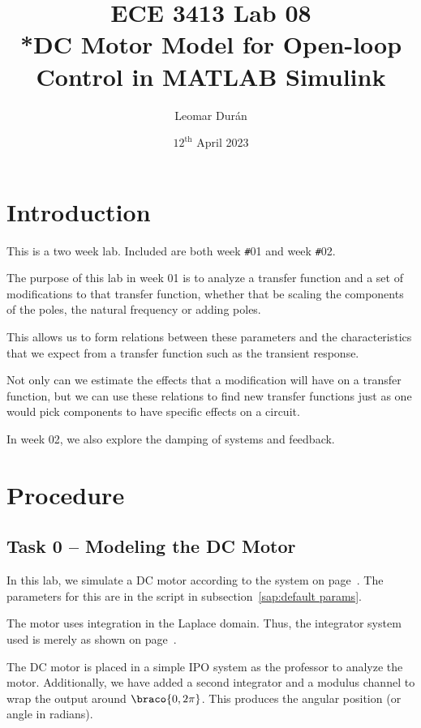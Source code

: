 \documentclass[12pt]{article}
\title{ECE 3413 Lab 08\\*DC Motor Model for Open-loop Control in MATLAB Simulink}
\author{Leomar Dur\'an}
\date{${12}^{\text{th}}$ April 2023}
\DeclarePairedDelimiter\braco[)%
\DeclarePairedDelimiter\braoo][%
\begin{document}
\maketitle
\newpage

\section{Introduction}

This is a two week lab.
Included are both week \texttt\#01 and week \texttt\#02.

The purpose of this lab in week 01 is to analyze a transfer function
and a set of modifications to that transfer function,
whether that be scaling the components of the poles, the natural frequency or adding poles.

This allows us to form relations between these parameters and the characteristics that we expect from a transfer function such as the transient response.

Not only can we estimate the effects that a modification will have on a transfer function, but we can use these relations to find new transfer functions just as one would pick components to have specific effects on a circuit.

In week 02, we also explore the damping of systems and feedback.

\section{Procedure}\label{sec:procedure}

\subsection{Task 0 -- Modeling the DC Motor}\label{ssc:dc motor model}

In this lab, we simulate a DC motor according to the system on page~\pageref{pdf:dc motor model}.
The parameters for this are in the script in  subsection~\ref{sap:default params}.

The motor uses integration in the Laplace domain.
Thus, the integrator system used is merely as shown on page~\pageref{pdf:integrators}.

The DC motor is placed in a simple IPO system as the professor to analyze the motor.
Additionally, we have added a second integrator and a modulus channel to wrap the output around $\braco{0, 2\pi}$.
This produces the angular position (or angle in radians).
\end{document}
